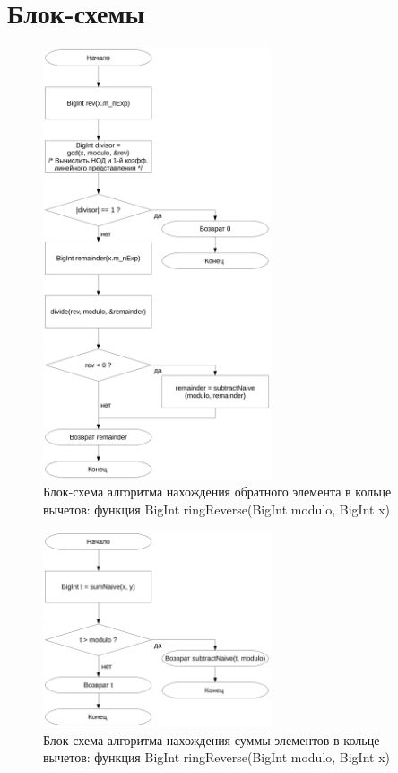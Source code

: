 \documentclass[a4paper,12pt]{article} %
\begin{document}
\section*{Блок-схемы}


\begin{figure}[ht]
	\centering
	\includegraphics[width=0.6\textwidth]{lr5_ringReverse.pdf}
	\caption{
		Блок-схема алгоритма нахождения обратного элемента в кольце вычетов:
		функция BigInt ringReverse(BigInt modulo, BigInt x)
	}
\end{figure}

\begin{figure}[ht]
	\centering
	\includegraphics[width=0.6\textwidth]{lr5_sumRing.pdf}
	\caption{
		Блок-схема алгоритма нахождения суммы элементов в кольце вычетов:
		функция BigInt ringReverse(BigInt modulo, BigInt x)
	}
\end{figure}
\end{document}
